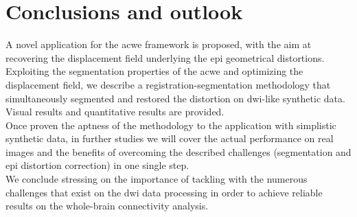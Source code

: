 \section{Conclusions and outlook}
\label{sec:conclusion}
%
A novel application for the \ac{acwe} framework is proposed,
with the aim at recovering the displacement field underlying 
the \ac{epi} geometrical distortions. Exploiting the segmentation
properties of the \ac{acwe} and optimizing the displacement
field, we describe a registration-segmentation methodology that
simultaneously segmented and restored the distortion on 
\ac{dwi}-like synthetic data. Visual results and quantitative
results are provided. \\

Once proven the aptness of the methodology to the application
with simplistic synthetic data, in further studies we will 
cover the actual performance on real images and the benefits 
of overcoming the described challenges (segmentation and 
\ac{epi} distortion correction) in one single step.\\

We conclude stressing on the importance of tackling with
the numerous challenges that exist on the \ac{dwi} data 
processing in order to achieve reliable results on the
whole-brain connectivity analysis.
